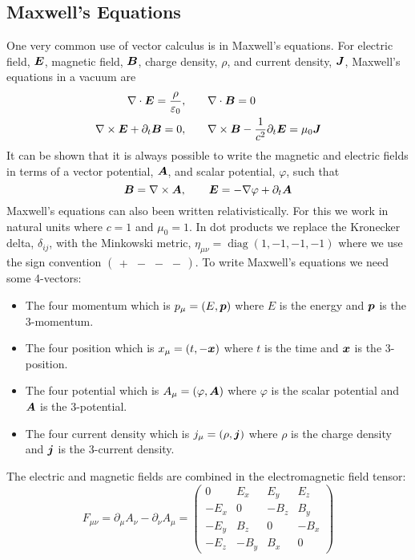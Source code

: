 \documentclass{article}
\begin{document}
    \subsection{Maxwell's Equations}
    One very common use of vector calculus is in Maxwell's equations.
    For electric field, \(\bm{E}\), magnetic field, \(\bm{B}\), charge density, \(\rho\), and current density, \(\bm{J}\), Maxwell's equations in a vacuum are
    \begin{align*}
    \nabla\cdot\bm{E} = \frac{\rho}{\varepsilon_0},&\qquad \nabla\cdot\bm{B} = 0\\
    \nabla\times\bm{E} + \partial_t\bm{B} = 0,&\qquad \nabla\times\bm{B} - \frac{1}{c^2}\partial_t\bm{E} = \mu_0\bm{J}
    \end{align*}
    It can be shown that it is always possible to write the magnetic and electric fields in terms of a vector potential, \(\bm{A}\), and scalar potential, \(\varphi\), such that
    \[\bm{B} = \nabla\times\bm{A},\qquad \bm{E} = -\nabla\varphi + \partial_t\bm{A}\]
    Maxwell's equations can also been written relativistically.
    For this we work in natural units where \(c = 1\) and \(\mu_0 = 1\).
    In dot products we replace the Kronecker delta, \(\delta_{ij}\), with the Minkowski metric, \(\eta_{\mu\nu} = \mathop{\mathrm{diag}}(1, -1, -1, -1)\) where we use the sign convention \((\begin{smallmatrix} + & - & - & - \end{smallmatrix})\).
    To write Maxwell's equations we need some 4-vectors:
    \begin{itemize}
    \item The four momentum which is \(p_\mu = (E, \bm{p})\) where \(E\) is the energy and \(\bm{p}\) is the 3-momentum.
    \item The four position which is \(x_\mu = (t, -\bm{x})\) where \(t\) is the time and \(\bm{x}\) is the 3-position.
    \item The four potential which is \(A_\mu = (\varphi, \bm{A})\) where \(\varphi\) is the scalar potential and \(\bm{A}\) is the 3-potential.
    \item The four current density which is \(j_\mu = (\rho, \bm{j})\) where \(\rho\) is the charge density and \(\bm{j}\) is the 3-current density.
    \end{itemize}
    The electric and magnetic fields are combined in the electromagnetic field tensor:
    \[
        F_{\mu\nu} = \partial_\mu A_\nu - \partial_\nu A_\mu = 
        \begin{pmatrix}
            0 & E_x & E_y & E_z\\
            -E_x & 0 & -B_z & B_y\\
            -E_y & B_z& 0 & -B_x\\
            -E_z & -B_y & B_x & 0
        \end{pmatrix}
    \]
\end{document}
